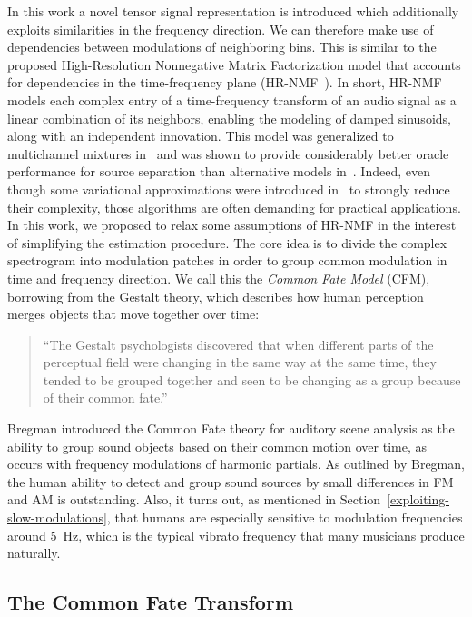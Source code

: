 In this work a novel tensor signal representation is introduced which additionally exploits similarities in the frequency direction.
We can therefore make use of dependencies between modulations of neighboring bins.
This is similar to the proposed High-Resolution Nonnegative Matrix Factorization model that accounts for dependencies in the time-frequency plane (HR-NMF~\cite{badeau11}).
In short, HR-NMF models each complex entry of a time-frequency transform of an audio signal as a linear combination of its neighbors, enabling the modeling of damped sinusoids, along with an independent innovation.
This model was generalized to multichannel mixtures in~\cite{badeau13a, badeau14} and was shown to provide considerably better oracle performance for source separation than alternative models in~\cite{magron15a}.
Indeed, even though some variational approximations were introduced in~\cite{badeau13} to strongly reduce their complexity, those algorithms are often demanding for practical applications.
In this work, we proposed to relax some assumptions of HR-NMF in the interest of simplifying the estimation procedure.
The core idea is to divide the complex spectrogram into modulation patches in order to group common modulation in time and frequency direction.
We call this the \emph{Common Fate Model} (CFM), borrowing from the Gestalt theory, which describes how human perception merges objects that move together over time:

\begin{quote}
``The Gestalt psychologists discovered that when different parts of the perceptual field were changing in the same way at the same time, they tended to be grouped together and seen to be changing as a group because of their common fate.''~\cite{bregman94}  
\end{quote}

Bregman introduced the Common Fate theory for auditory scene analysis as the ability to group sound objects based on their common motion over time, as occurs with frequency modulations of harmonic partials.
As outlined by Bregman, the human ability to detect and group sound sources by small differences in FM and AM is outstanding.
Also, it turns out, as mentioned in Section~\ref{exploiting-slow-modulations}, that humans are especially sensitive to modulation frequencies around 5~Hz, which is the typical vibrato frequency that many musicians produce naturally.

\subsection{The Common Fate Transform}
\label{sub:CFT}

